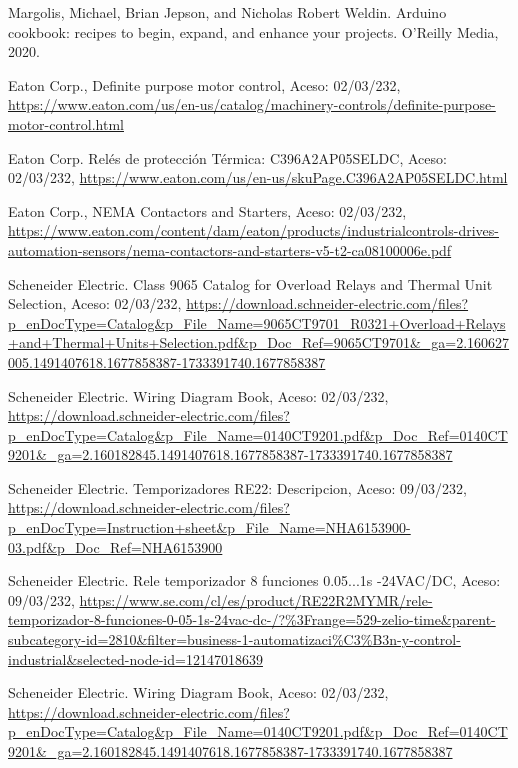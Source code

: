 
\setcounter{chapter}{9}
\begin{thebibliography}{9}
	
	Margolis, Michael, Brian Jepson, and Nicholas Robert Weldin. Arduino cookbook: recipes to begin, expand, and enhance your projects. O'Reilly Media, 2020.
	
	Eaton Corp., Definite purpose motor control, Aceso: 02/03/232, \url{https://www.eaton.com/us/en-us/catalog/machinery-controls/definite-purpose-motor-control.html }
	
	Eaton Corp. Relés de protección Térmica: C396A2AP05SELDC, Aceso: 02/03/232, \url{https://www.eaton.com/us/en-us/skuPage.C396A2AP05SELDC.html}
	
	Eaton Corp., NEMA Contactors and Starters, Aceso: 02/03/232, \url{ https://www.eaton.com/content/dam/eaton/products/industrialcontrols-drives-automation-sensors/nema-contactors-and-starters-v5-t2-ca08100006e.pdf}
	
	Scheneider Electric. Class 9065 Catalog for Overload Relays and Thermal Unit Selection, Aceso: 02/03/232, \url{https://download.schneider-electric.com/files?p_enDocType=Catalog&p_File_Name=9065CT9701_R0321+Overload+Relays+and+Thermal+Units+Selection.pdf&p_Doc_Ref=9065CT9701&_ga=2.160627005.1491407618.1677858387-1733391740.1677858387}
	
	Scheneider Electric. Wiring Diagram Book, Aceso: 02/03/232, \url{https://download.schneider-electric.com/files?p_enDocType=Catalog&p_File_Name=0140CT9201.pdf&p_Doc_Ref=0140CT9201&_ga=2.160182845.1491407618.1677858387-1733391740.1677858387}
	
	Scheneider Electric. Temporizadores RE22: Descripcion, Aceso: 09/03/232, \url{https://download.schneider-electric.com/files?p_enDocType=Instruction+sheet&p_File_Name=NHA6153900-03.pdf&p_Doc_Ref=NHA6153900}
	
	Scheneider Electric. Rele temporizador 8 funciones 0.05...1s -24VAC/DC, Aceso: 09/03/232, \url{https://www.se.com/cl/es/product/RE22R2MYMR/rele-temporizador-8-funciones-0-05-1s-24vac-dc-/?%3Frange=529-zelio-time&parent-subcategory-id=2810&filter=business-1-automatizaci%C3%B3n-y-control-industrial&selected-node-id=12147018639}
		
		Scheneider Electric. Wiring Diagram Book, Aceso: 02/03/232, \url{https://download.schneider-electric.com/files?p_enDocType=Catalog&p_File_Name=0140CT9201.pdf&p_Doc_Ref=0140CT9201&_ga=2.160182845.1491407618.1677858387-1733391740.1677858387}
		

\end{thebibliography}
